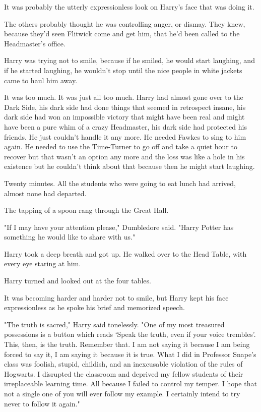 It was probably the utterly expressionless look on Harry's face that was doing
it.

The others probably thought he was controlling anger, or dismay. They knew,
because they'd seen Flitwick come and get him, that he'd been called to the
Headmaster's office.

Harry was trying not to smile, because if he smiled, he would start laughing,
and if he started laughing, he wouldn't stop until the nice people in white
jackets came to haul him away.

It was too much. It was just all too much. Harry had almost gone over to the
Dark Side, his dark side had done things that seemed in retrospect insane, his
dark side had won an impossible victory that might have been real and might
have been a pure whim of a crazy Headmaster, his dark side had protected his
friends. He just couldn't handle it any more. He needed Fawkes to sing to him
again. He needed to use the Time-Turner to go off and take a quiet hour to
recover but that wasn't an option any more and the loss was like a hole in his
existence but he couldn't think about that because then he might start laughing.

Twenty minutes. All the students who were going to eat lunch had arrived,
almost none had departed.

The tapping of a spoon rang through the Great Hall.

"If I may have your attention please," Dumbledore said. "Harry Potter has
something he would like to share with us."

Harry took a deep breath and got up. He walked over to the Head Table, with
every eye staring at him.

Harry turned and looked out at the four tables.

It was becoming harder and harder not to smile, but Harry kept his face
expressionless as he spoke his brief and memorized speech.

"The truth is sacred," Harry said tonelessly. "One of my most treasured
possessions is a button which reads `Speak the truth, even if your voice
trembles'. This, then, is the truth. Remember that. I am not saying it because
I am being forced to say it, I am saying it because it is true. What I did in
Professor Snape's class was foolish, stupid, childish, and an inexcusable
violation of the rules of Hogwarts. I disrupted the classroom and deprived my
fellow students of their irreplaceable learning time. All because I failed to
control my temper. I hope that not a single one of you will ever follow my
example. I certainly intend to try never to follow it again."

